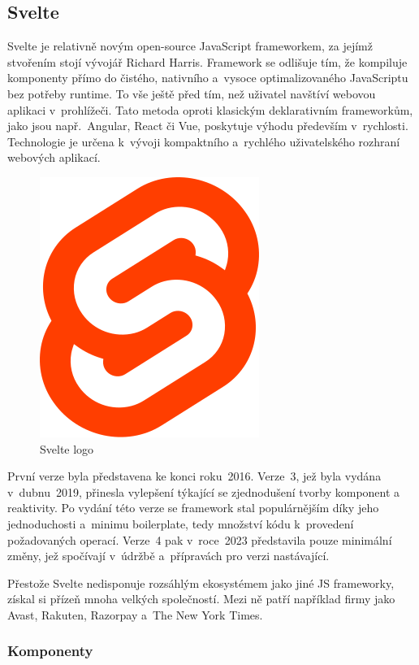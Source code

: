 \subsection{Svelte}

Svelte je relativně novým open-source JavaScript frameworkem, za jejímž stvořením stojí vývojář Richard Harris. 
Framework se odlišuje tím, že kompiluje komponenty přímo do čistého, nativního a~vysoce optimalizovaného JavaScriptu bez potřeby runtime. 
To vše ještě před tím, než uživatel navštíví webovou aplikaci v~prohlížeči. 
Tato metoda oproti klasickým deklarativním frameworkům, jako jsou např.~Angular, React či Vue, poskytuje výhodu především v~rychlosti. 
Technologie je určena k~vývoji kompaktního a~rychlého uživatelského rozhraní webových aplikací.\cite{sveltemdn,svelte,sveltedevinterface}

\begin{figure}[htb]
	\centering
		\includegraphics[width=.18\textwidth]{images/svelte-logo.png}
	\caption[Svelte logo]{Svelte logo \cite{svelte}}
	\label{fig:sveltelogo}
\end{figure}

První verze byla představena ke konci roku~2016. Verze~3, jež byla vydána v~dubnu~2019, přinesla vylepšení týkající se zjednodušení tvorby komponent a reaktivity. 
Po vydání této verze se framework stal populárnějším díky jeho jednoduchosti a~minimu boilerplate, tedy množství kódu k~provedení požadovaných operací. 
Verze~4 pak v~roce~2023 představila pouze minimální změny, jež spočívají v~údržbě a~přípravách pro verzi nastávající.

Přestože Svelte nedisponuje rozsáhlým ekosystémem jako jiné JS frameworky, získal si přízeň mnoha velkých společností. 
Mezi ně patří například firmy jako Avast, Rakuten, Razorpay a~The New York Times.\cite{sveltemdn,svelte,sveltedevinterface}

\subsubsection{Komponenty}

